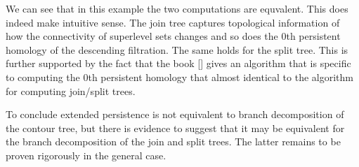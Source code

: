 We can see that in this example the two computations are equvalent. This does indeed make intuitive sense. The join tree captures topological information of how the connectivity of superlevel sets changes and so does the 0th persistent homology of the descending filtration. The same holds for the split tree. This is further supported by the fact that the book [] gives an algorithm that is specific to computing the 0th persistent homology that almost identical to the algorithm for computing join/split trees.

To conclude extended persistence is not equivalent to branch decomposition of the contour tree, but there is evidence to suggest that it may be equivalent for the branch decomposition of the join and split trees. The latter remains to be proven rigorously in the general case.




%
%
%





